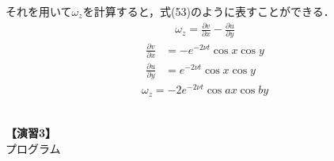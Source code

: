 \documentclass[12pt,a4paper]{jsarticle}
\begin{document}
それを用いて$\omega_z$を計算すると，式(53)のように表すことができる．
\begin{eqnarray}
    \omega_z
    =
    \frac{\partial v}{\partial x}
    -
    \frac{\partial u}{\partial y}
\end{eqnarray}
\begin{eqnarray}
    \frac{\partial v}{\partial x}
    &=
    -e^{- 2 \nu t}\cos{x} \cos{y}
    \\
    \frac{\partial u}{\partial y}
    &=
    e^{- 2 \nu t}\cos{x} \cos{y}
\end{eqnarray}
\begin{eqnarray}
    \omega_z
    =
    -2 e^{- 2 \nu t}
    \cos{ax} \cos{by}
\end{eqnarray}\\
\begin{flushleft}
    {\large \textbf{【演習3】}\\
        プログラム} \\
\end{flushleft}
\small
\end{document}
